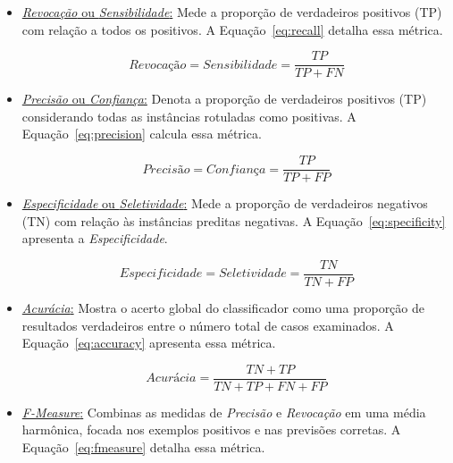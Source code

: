 \begin{itemize}
    \item 
    \underline{\textit{Revocação} ou \textit{Sensibilidade}:} 
    Mede a proporção de verdadeiros positivos (TP) com relação a todos os positivos.
    A Equação~\eqref{eq:recall} detalha essa métrica.

    \begin{equation} \label{eq:recall}
        \textit{Revocação} = Sensibilidade = \frac{TP}{TP + FN}
    \end{equation}
    
    \item  
    \underline{\textit{Precisão} ou \textit{Confiança}:} 
    Denota a proporção de verdadeiros positivos (TP) considerando todas as instâncias rotuladas como positivas.
    A Equação~\eqref{eq:precision} calcula essa métrica. 

    \begin{equation} \label{eq:precision}
         \textit{Precisão} = \textit{Confiança} =\frac{TP}{TP + FP}
    \end{equation}
    
    \item 
    \underline{\textit{Especificidade} ou \textit{Seletividade}:} 
    Mede a proporção de verdadeiros negativos (TN) com relação às instâncias preditas negativas.
    A Equação~\eqref{eq:specificity} apresenta a \textit{Especificidade}.  
    
    \begin{equation} \label{eq:specificity}
        \textit{Especificidade} =  \textit{Seletividade} = \frac{TN}{TN + FP}
    \end{equation}
    
    \item 
    \underline{\textit{Acurácia}:} 
    Mostra o acerto global do classificador como uma proporção de resultados verdadeiros entre o número total de casos examinados.
    A Equação~\eqref{eq:accuracy} apresenta essa métrica.
    
    \begin{equation} \label{eq:accuracy}
        \textit{Acurácia} = \frac{TN+TP}{TN + TP + FN + FP}
    \end{equation}

    \item 
    \underline{\textit{F-Measure}:} 
    Combinas as medidas de \textit{Precisão} e \textit{Revocação} em uma média harmônica, focada nos exemplos positivos e nas previsões corretas.
    A Equação~\ref{eq:fmeasure} detalha essa métrica.
    

\end{itemize}
